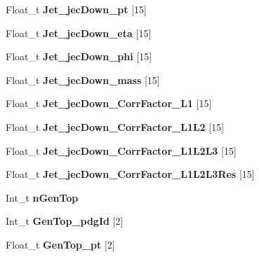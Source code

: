 \begin{DoxyCompactItemize}
Float\+\_\+t {\bfseries Jet\+\_\+jec\+Down\+\_\+pt} \mbox{[}15\mbox{]}
\item 
\hypertarget{classMiniTree_aa333577e37033226917345f047f69439}{}\label{classMiniTree_aa333577e37033226917345f047f69439} 
Float\+\_\+t {\bfseries Jet\+\_\+jec\+Down\+\_\+eta} \mbox{[}15\mbox{]}
\item 
\hypertarget{classMiniTree_aa96be2daad6d1e5b7692f48199ae3141}{}\label{classMiniTree_aa96be2daad6d1e5b7692f48199ae3141} 
Float\+\_\+t {\bfseries Jet\+\_\+jec\+Down\+\_\+phi} \mbox{[}15\mbox{]}
\item 
\hypertarget{classMiniTree_af3d09702f7f07cbc38b9c0b32dfa16fa}{}\label{classMiniTree_af3d09702f7f07cbc38b9c0b32dfa16fa} 
Float\+\_\+t {\bfseries Jet\+\_\+jec\+Down\+\_\+mass} \mbox{[}15\mbox{]}
\item 
\hypertarget{classMiniTree_ab7df778e9ff105434d0f7e443b4b2a3a}{}\label{classMiniTree_ab7df778e9ff105434d0f7e443b4b2a3a} 
Float\+\_\+t {\bfseries Jet\+\_\+jec\+Down\+\_\+\+Corr\+Factor\+\_\+\+L1} \mbox{[}15\mbox{]}
\item 
\hypertarget{classMiniTree_acf3c85f759a2fc16fe9bf4acde53b000}{}\label{classMiniTree_acf3c85f759a2fc16fe9bf4acde53b000} 
Float\+\_\+t {\bfseries Jet\+\_\+jec\+Down\+\_\+\+Corr\+Factor\+\_\+\+L1\+L2} \mbox{[}15\mbox{]}
\item 
\hypertarget{classMiniTree_a6277b6b99ab55722d8650941c456dae9}{}\label{classMiniTree_a6277b6b99ab55722d8650941c456dae9} 
Float\+\_\+t {\bfseries Jet\+\_\+jec\+Down\+\_\+\+Corr\+Factor\+\_\+\+L1\+L2\+L3} \mbox{[}15\mbox{]}
\item 
\hypertarget{classMiniTree_ab1ef88a5868a389c738cf66249518413}{}\label{classMiniTree_ab1ef88a5868a389c738cf66249518413} 
Float\+\_\+t {\bfseries Jet\+\_\+jec\+Down\+\_\+\+Corr\+Factor\+\_\+\+L1\+L2\+L3\+Res} \mbox{[}15\mbox{]}
\item 
\hypertarget{classMiniTree_a607e1d9ee9f1c4de7ba527f509ff6dab}{}\label{classMiniTree_a607e1d9ee9f1c4de7ba527f509ff6dab} 
Int\+\_\+t {\bfseries n\+Gen\+Top}
\item 
\hypertarget{classMiniTree_abb445dd5c4a87189533d9bd59350550a}{}\label{classMiniTree_abb445dd5c4a87189533d9bd59350550a} 
Int\+\_\+t {\bfseries Gen\+Top\+\_\+pdg\+Id} \mbox{[}2\mbox{]}
\item 
\hypertarget{classMiniTree_a73ca153643cad275110c49c1e51ad998}{}\label{classMiniTree_a73ca153643cad275110c49c1e51ad998} 
Float\+\_\+t {\bfseries Gen\+Top\+\_\+pt} \mbox{[}2\mbox{]}
\item 
\hypertarget{classMiniTree_a09c5af60d5d780c04a82c4b67bf6d5fd}{}\label{classMiniTree_a09c5af60d5d780c04a82c4b67bf6d5fd} 

\end{DoxyCompactItemize}
